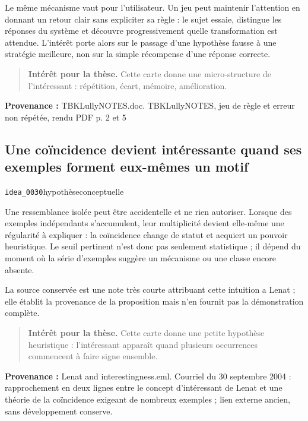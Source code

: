 \documentclass[10pt,a4paper]{article}
\begin{document}
Le même mécanisme vaut pour l'utilisateur. Un jeu peut maintenir l'attention en donnant un retour clair sans expliciter sa règle : le sujet essaie, distingue les réponses du système et découvre progressivement quelle transformation est attendue. L'intérêt porte alors sur le passage d'une hypothèse fausse à une stratégie meilleure, non sur la simple récompense d'une réponse correcte.

\begin{quote}
\textbf{Intérêt pour la thèse.} Cette carte donne une micro-structure de l'intéressant : répétition, écart, mémoire, amélioration.
\end{quote}
{\footnotesize\color{metadata}\textbf{Provenance :} TBKLullyNOTES.doc. TBKLullyNOTES, jeu de règle et erreur non répétée, rendu PDF p. 2 et 5\par}

\subsection{Une coïncidence devient intéressante quand ses exemples forment eux-mêmes un motif}
{\small\color{metadata} \texttt{idea\_0030}\quad\textbullet\quad hypothèse\quad\textbullet\quad conceptuelle\par}

Une ressemblance isolée peut être accidentelle et ne rien autoriser. Lorsque des exemples indépendants s'accumulent, leur multiplicité devient elle-même une régularité à expliquer : la coïncidence change de statut et acquiert un pouvoir heuristique. Le seuil pertinent n'est donc pas seulement statistique ; il dépend du moment où la série d'exemples suggère un mécanisme ou une classe encore absente.

La source conservée est une note très courte attribuant cette intuition a Lenat ; elle établit la provenance de la proposition mais n'en fournit pas la démonstration complète.

\begin{quote}
\textbf{Intérêt pour la thèse.} Cette carte donne une petite hypothèse heuristique : l'intéressant apparaît quand plusieurs occurrences commencent à faire signe ensemble.
\end{quote}
{\footnotesize\color{metadata}\textbf{Provenance :} Lenat and interestingness.eml. Courriel du 30 septembre 2004 : rapprochement en deux lignes entre le concept d'intéressant de Lenat et une théorie de la coïncidence exigeant de nombreux exemples ; lien externe ancien, sans développement conserve.\par}
\end{document}
